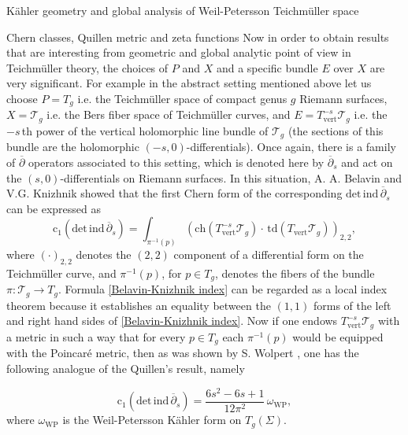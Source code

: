 \documentclass[12pt]{amsart}
\theoremstyle{plain}
\theoremstyle{definition}
\theoremstyle{remark}
\numberwithin{equation}{section} %
\numberwithin{figure}{section} %
\begin{document}
\begin{section}{K\"ahler geometry and global analysis of Weil-Petersson Teichm\"uller space}
\begin{subsection}{Chern classes, Quillen metric and zeta functions}
Now in order to obtain results that are interesting from geometric and global analytic point of view in Teichm\"uller theory, the choices of $P$ and $X$ and a specific bundle $E$ over $X$ are very significant. For example in the abstract setting mentioned above let us choose $P= T_g $ i.e. the Teichm\"uller space of compact genus $g$ Riemann surfaces, $X=\mathscr{T}_g$ i.e. the Bers fiber space of Teichm\"uller curves, and $E=T_{\mathrm{vert}}^{-s}\mathscr{T}_g $ i.e. the $-s\,$th power of the vertical holomorphic line bundle of $\mathscr{T}_g$ (the sections of this bundle are the holomorphic $(-s,0)$-differentials). Once again, there is a family of $\overline\partial$ operators associated to this setting, which is denoted here by $\overline{\partial}_{s}$ and act on the $(s,0)$-differentials on Riemann surfaces. In this situation, A. A. Belavin and V.G. Knizhnik \cite{Belavin} showed that the first Chern form of the corresponding $\mathrm{det\, ind }\,\overline{\partial}_{s}$ can be expressed as
\begin{equation}\label{Belavin-Knizhnik index}
  \mathrm{c}_{1}(\mathrm{det\, ind }\,\overline{\partial}_{s})=\int_{\pi^{-1}(p)}( \mathrm{ch}(T_{\mathrm{vert}}^{-s}\mathscr{T}_g)\cdot\,\mathrm{td}(T_{\mathrm{vert}}\mathscr{T}_g))_{2,2},
\end{equation}
where $(\cdot)_{2,2}$ denotes the $(2,2)$ component of a differential form on the Teichm\"uller curve, and $\pi^{-1}(p)$, for $p\in T_g $, denotes the fibers of the bundle $\pi: \mathscr{T}_g\to T_g$. Formula \eqref{Belavin-Knizhnik index} can be regarded as a local index theorem because it establishes an equality between the $(1,1)$ forms of the left and right hand sides of \eqref{Belavin-Knizhnik index}. Now if one endows $T_{\mathrm{vert}}^{-s}\mathscr{T}_g$ with a metric in such a way that for every $p\in T_g$ each $\pi^{-1}(p)$ would be equipped with the Poincar\'e metric, then as was shown by S. Wolpert \cite{Wolpert}, one has the following analogue of the Quillen's result, namely

\begin{equation}\label{Wolpert index}
  \mathrm{c}_{1}(\mathrm{det\, ind }\,\overline{\partial}_{s})=\frac{6s^2 -6s+1}{12\pi^2}\,\omega_{\mathrm{WP}},
\end{equation}
where $\omega_{\mathrm{WP}}$ is the Weil-Petersson K\"ahler form on  $T_g (\Sigma)$.
\\


\end{subsection}
\end{section}
\end{document}
